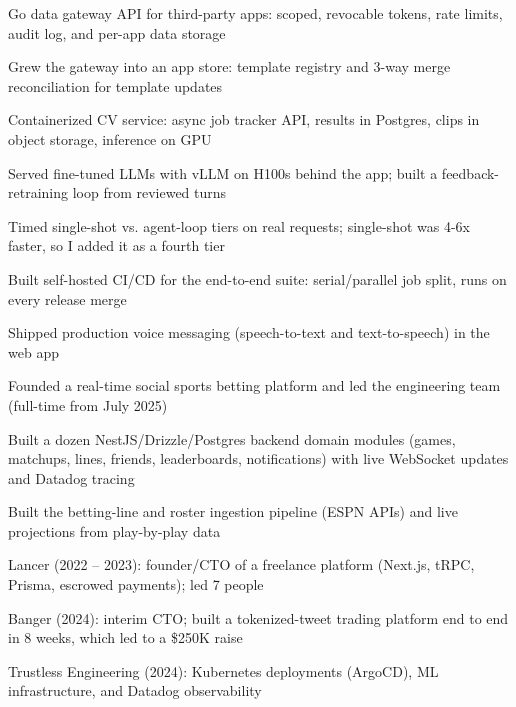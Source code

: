\documentclass[print]{jack-resume}
\begin{document}
\begin{tightemize}
    \item Go data gateway API for third-party apps: scoped, revocable tokens, rate limits, audit log, and per-app data storage
    \item Grew the gateway into an app store: template registry and 3-way merge reconciliation for template updates
    \item Containerized CV service: async job tracker API, results in Postgres, clips in object storage, inference on GPU
    \item Served fine-tuned LLMs with vLLM on H100s behind the app; built a feedback-retraining loop from reviewed turns
    \item Timed single-shot vs. agent-loop tiers on real requests; single-shot was 4-6x faster, so I added it as a fourth tier
    \item Built self-hosted CI/CD for the end-to-end suite: serial/parallel job split, runs on every release merge
    \item Shipped production voice messaging (speech-to-text and text-to-speech) in the web app
\end{tightemize}
\sectionsep

\begin{tightemize}
    \item Founded a real-time social sports betting platform and led the engineering team (full-time from July 2025)
    \item Built a dozen NestJS/Drizzle/Postgres backend domain modules (games, matchups, lines, friends, leaderboards, notifications) with live WebSocket updates and Datadog tracing
    \item Built the betting-line and roster ingestion pipeline (ESPN APIs) and live projections from play-by-play data
\end{tightemize}
\sectionsep

\begin{tightemize}
    \item Lancer (2022 -- 2023): founder/CTO of a freelance platform (Next.js, tRPC, Prisma, escrowed payments); led 7 people
    \item Banger (2024): interim CTO; built a tokenized-tweet trading platform end to end in 8 weeks, which led to a \$250K raise
    \item Trustless Engineering (2024): Kubernetes deployments (ArgoCD), ML infrastructure, and Datadog observability
\end{tightemize}
\sectionsep
\end{document}
